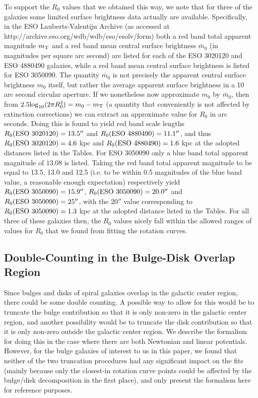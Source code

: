\documentclass[preprint,aps]{revtex4}
\begin{document}
To support the $R_0$ values that we obtained this way, we note that for three of the galaxies some limited surface brightness data actually are available. Specifically, in the ESO Lauberts-Valentijn Archive (as accessed at  http://archive.eso.org/wdb/wdb/eso/esolv/form) both a red band total apparent magnitude $m_{\rm T}$ and a red band mean  central surface brightness $\bar{m}_0$ (in magnitudes per square arc second) are listed for each of the ESO 3020120 and ESO 4880490 galaxies, while a red band mean central surface brightness is listed for ESO 3050090. The quantity $\bar{m}_0$ is not precisely the apparent central surface brightness $m_0$ itself, but rather the average apparent surface brightness in a 10 arc second circular aperture. If we nonetheless now approximate $m_0$ by $\bar{m}_0$, then from $2.5{\rm log}_{10}(2\pi R_0^2)=m_0-m_{\rm T}$ (a quantity that conveniently is not affected by extinction corrections) we can extract an approximate value for $R_0$ in arc seconds. Doing this is found to yield red band scale lengths $R_0({\rm ESO}~3020120)=13.5''$   and $R_0({\rm ESO}~4880490) =11.1''$, and thus $R_0({\rm ESO}~3020120)=4.6$ kpc and $R_0({\rm ESO}~4880490)=1.6$ kpc at the adopted distances listed in the Tables.  For ESO 3050090 only a blue band total apparent magnitude of $13.08$ is listed. Taking the red band total apparent magnitude to be equal  to 13.5, 13.0 and 12.5 (i.e. to be within 0.5 magnitudes of the blue band value, a reasonable enough expectation) respectively yield $R_0({\rm ESO}~3050090)=15.9''$, $R_0({\rm ESO}~3050090)=20.0''$ and $R_0({\rm ESO}~3050090)=25''$, with the $20''$ value corresponding to $R_0({\rm ESO}~3050090)=1.3$ kpc  at the adopted distance listed in the Tables. For all three of these galaxies then, the $R_0$ values nicely fall within the allowed ranges of values for $R_0$ that we found from fitting the rotation curves. 






\subsection{Double-Counting in the Bulge-Disk Overlap Region}

Since bulges and disks of spiral galaxies overlap in the galactic center region, there could be some double counting. A possible way to allow for this would be to truncate the bulge contribution so that it is only non-zero in the galactic center region, and another possibility would be to truncate the disk contribution so that it is only non-zero outside the galactic center region. We describe the formalism for doing this in the case where there are both Newtonian and linear potentials. However, for the bulge galaxies of interest to us in this paper, we found that neither of the two truncation procedures had any significant impact on the fits (mainly because only the closest-in rotation curve points could be affected by the bulge/disk decomposition in the first place), and only present the formalism here for reference purposes.
\end{document}
